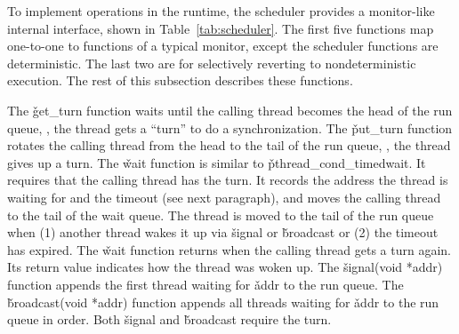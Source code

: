 \begin{table}[t]
\centering
\small
\begin{minipage}[t]{.25\textwidth}
\end{minipage}
\vspace{-.05in}
\caption{{\em Scheduler primitives.}} \label{tab:scheduler}
\vspace{-.05in}
\end{table}

To implement operations in the \xxx runtime, the scheduler provides a
monitor-like internal interface, shown in Table~\ref{tab:scheduler}.  The
first five functions map one-to-one to functions of a typical monitor,
except the scheduler functions are deterministic.  The last two are for
selectively reverting to nondeterministic execution.  The rest of this
subsection describes these functions.

The
\v{get\_turn} function waits until the calling thread becomes the head
of the run queue, \ie, the thread gets a ``turn'' to do a
synchronization.  The \v{put\_turn} function rotates the calling thread
from the head to the tail of the run queue, \ie, the thread gives up a
turn. The \v{wait} function is similar to
\v{pthread\_cond\_timedwait}.  It requires that the calling thread has the
turn.  It records the address the thread is waiting for and the timeout
(see next paragraph), and moves the calling thread to the tail
of the wait queue.  The thread is moved to the tail of the
run queue when (1) another thread wakes it up via \v{signal}
or \v{broadcast} or (2) the timeout has expired. The \v{wait}
function returns when the calling thread gets a turn again.  Its return
value indicates how the thread was woken up. The \v{signal(void *addr)}
function appends the first thread waiting for \v{addr} to the run queue.  The
\v{broadcast(void *addr)} function appends all threads waiting for
\v{addr} to the run queue in order.  Both \v{signal} and \v{broadcast} require
the turn.

